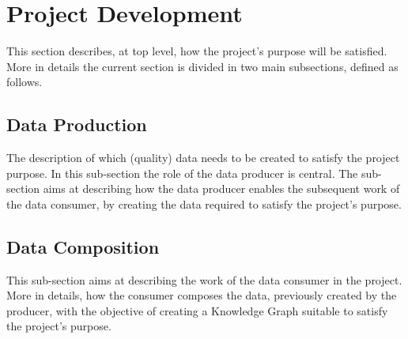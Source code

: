 \section{Project Development}
This section describes, at top level, how the project's purpose will be satisfied.
More in details the current section is divided in two main subsections, defined as follows.

\subsection{Data Production}
The description of which (quality) data needs to be created to satisfy the project purpose. In this sub-section the role of the data producer is central. The sub-section aims at describing how the data producer enables the subsequent work of the data consumer, by creating the data required to satisfy the project's purpose.

\subsection{Data Composition}
This sub-section aims at describing the work of the data consumer in the project. More in details, how the consumer composes the data, previously created by the producer, with the objective of creating a Knowledge Graph suitable to satisfy the project's purpose.

